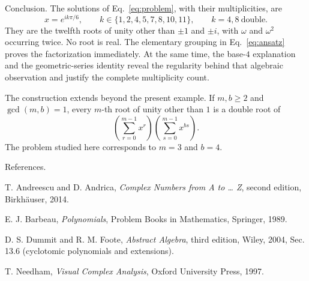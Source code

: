 \documentclass[11pt,aspectratio=169]{beamer}
\newcommand{\slidebody}{%
  \fontsize{10.6}{12.8}\selectfont\justifying%
  \setlength{\parskip}{4.2pt}%
  \setlength{\abovedisplayskip}{4pt}%
  \setlength{\belowdisplayskip}{4pt}%
  \setlength{\abovedisplayshortskip}{2pt}%
  \setlength{\belowdisplayshortskip}{2.5pt}%
}
\newcommand{\tightbody}{\slidebody\fontsize{10.2}{12.3}\selectfont\setlength{\parskip}{3pt}}
\begin{document}
\begin{frame}[t]{Conclusion.}
\tightbody
The solutions of Eq.~\eqref{eq:problem}, with their multiplicities, are
\begin{equation}\label{eq:final-roots}
 x=e^{ik\pi/6},\qquad
 k\in\{1,2,4,5,7,8,10,11\},
 \qquad k=4,8\ \text{double}.
\end{equation}
They are the twelfth roots of unity other than $\pm1$ and $\pm i$, with $\omega$ and $\omega^2$ occurring twice. No root is real. The elementary grouping in Eq.~\eqref{eq:ansatz} proves the factorization immediately. At the same time, the base-$4$ explanation and the geometric-series identity reveal the regularity behind that algebraic observation and justify the complete multiplicity count.

The construction extends beyond the present example. If $m,b\ge 2$ and $\gcd(m,b)=1$, every $m$-th root of unity other than $1$ is a double root of
\begin{equation}\label{eq:generalization}
 \left(\sum_{r=0}^{m-1}x^r\right)
 \left(\sum_{s=0}^{m-1}x^{bs}\right).
\end{equation}
The problem studied here corresponds to $m=3$ and $b=4$.
\end{frame}

\begin{frame}[t]{References.}
\slidebody
\begingroup
\fontsize{10.45}{14.0}\selectfont
\begin{list}{\textbullet}{%
\setlength{\leftmargin}{5.5mm}%
\setlength{\labelwidth}{2.5mm}%
\setlength{\labelsep}{2.1mm}%
\setlength{\itemindent}{0pt}%
\setlength{\itemsep}{3.8mm}%
\setlength{\parsep}{0pt}%
}
\item \justifying T. Andreescu and D. Andrica, \textit{Complex Numbers from A to \ldots{} Z}, second edition, Birkhäuser, 2014.
\item \justifying E. J. Barbeau, \textit{Polynomials}, Problem Books in Mathematics, Springer, 1989.
\item \justifying D. S. Dummit and R. M. Foote, \textit{Abstract Algebra}, third edition, Wiley, 2004, Sec. 13.6 (cyclotomic polynomials and extensions).
\item \justifying T. Needham, \textit{Visual Complex Analysis}, Oxford University Press, 1997.
\end{list}
\endgroup
\end{frame}
\end{document}
